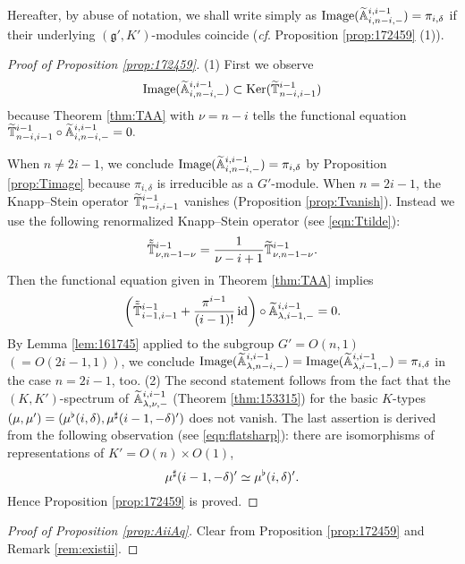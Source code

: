 \begin{convention}
\label{conv:Image}
Hereafter,
 by abuse of notation,
 we shall write simply as 
${\operatorname{Image}}({\widetilde{\mathbb{A}}}_{{i},{n-i},{-}}^{{i,i-1}})=\pi_{i,\delta}$
 if their underlying $({\mathfrak{g}}',K')$-modules coincide
 ({\it{cf}}. Proposition \ref{prop:172459} (1)).  
\end{convention}
\newpage
\begin{proof}
[Proof of Proposition \ref{prop:172459}]
(1)\enspace
First we observe
\[
   {\operatorname{Image}}({\widetilde{\mathbb{A}}}_{{i},{n-i},{-}}^{{i,i-1}})
  \subset 
   {\operatorname{Ker}}(\widetilde{{\mathbb{T}}}_{{n-i},{i-1}}^{{i-1}})
\]
because Theorem \ref{thm:TAA} with $\nu=n-i$ tells the functional equation
$
   \widetilde{{\mathbb{T}}}_{{n-i},{i-1}}^{{i-1}} \circ {\widetilde{\mathbb{A}}}_{{i},{n-i},{-}}^{{i,i-1}}=0.  
$



When $n \ne 2i-1$, 
 we conclude ${\operatorname{Image}}({\widetilde{\mathbb{A}}}_{{i},{n-i},{-}}^{{i,i-1}})=\pi_{i,\delta}$ 
 by Proposition \ref{prop:Timage}
 because $\pi_{i,\delta}$ is irreducible as a $G'$-module.  
When $n=2i-1$, 
 the Knapp--Stein operator $\widetilde{{\mathbb{T}}}_{{n-i},{i-1}}^{{i-1}}$
 vanishes 
 (Proposition \ref{prop:Tvanish}).  
Instead we use the following renormalized Knapp--Stein operator
 (see \eqref{eqn:Ttilde}):
\[
   \tilde{\tilde{{\mathbb{T}}}}_{{\nu},{n-1-\nu}}^{{i-1}}
   =
  \frac {1}{\nu-i+1}\widetilde{{\mathbb{T}}}_{{\nu},{n-1-\nu}}^{{i-1}}.  
\]
Then the functional equation given in Theorem \ref{thm:TAA} implies
\[
   \left(
   \tilde{\tilde{{\mathbb{T}}}}_{{i-1},{i-1}}^{{i-1}} + \frac{\pi^{i-1}}{(i-1)!}\, {\operatorname{id}}
   \right)
   \circ {\widetilde{\mathbb{A}}}_{{\lambda},{i-1},{-}}^{{i,i-1}}=0.  
\]
By Lemma \ref{lem:161745} applied to the subgroup $G'=O(n,1)$ $(=O(2i-1,1))$, 
 we conclude 
 ${\operatorname{Image}}({\widetilde{\mathbb{A}}}_{{\lambda},{n-i},{-}}^{{i,i-1}})
={\operatorname{Image}}({\widetilde{\mathbb{A}}}_{{\lambda},{i-1},{-}}^{{i,i-1}})=\pi_{i,\delta}$
 in the case $n=2i-1$, too.  
\newline\noindent
(2)\enspace
The second statement follows from the fact
 that the $(K,K')$-spectrum of ${\widetilde{\mathbb{A}}}_{{\lambda},{\nu},{-}}^{{i,i-1}}$
 (Theorem \ref{thm:153315})
 for the basic $K$-types
 $(\mu,\mu')=(\mu^{\flat}(i,\delta),\mu^{\sharp}(i-1,-\delta)')$
 does not vanish.  
The last assertion is derived from the following observation 
 (see \eqref{eqn:flatsharp}):
there are isomorphisms
 of representations of $K'=O(n) \times O(1)$, 
\[
  \mu^{\sharp} (i-1,-\delta)'\simeq \mu^{\flat}(i,\delta)'.  
\]
Hence Proposition \ref{prop:172459} is proved.  
\end{proof}

\begin{proof}
[Proof of Proposition \ref{prop:AiiAq}]
Clear from Proposition \ref{prop:172459}
 and Remark \ref{rem:existii}.  
\end{proof}

